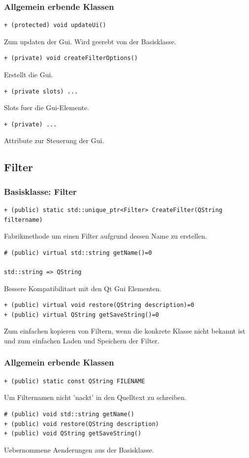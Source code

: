 \documentclass[parskip=full]{scrartcl}
\begin{document}
\subsubsection{Allgemein erbende Klassen}
\begin{verbatim}
+ (protected) void updateUi()
\end{verbatim}
Zum updaten der Gui. Wird geerebt von der Basisklasse.
\begin{verbatim}
+ (private) void createFilterOptions()
\end{verbatim}
Erstellt die Gui.
\begin{verbatim}
+ (private slots) ...
\end{verbatim}
Slots fuer die Gui-Elemente.
\begin{verbatim}
+ (private) ...
\end{verbatim}
Attribute zur Steuerung der Gui.
\newpage
\subsection{Filter}
\subsubsection{Basisklasse: Filter}
\begin{verbatim}
+ (public) static std::unique_ptr<Filter> CreateFilter(QString filtername)
\end{verbatim}
Fabrikmethode um einen Filter aufgrund dessen Name zu erstellen.
\begin{verbatim}
# (public) virtual std::string getName()=0

std::string => QString
\end{verbatim}
Bessere Kompatibilitaet mit den Qt Gui Elementen.

\begin{verbatim}
+ (public) virtual void restore(QString description)=0
+ (public) virtual QString getSaveString()=0
\end{verbatim}
Zum einfachen kopieren von Filtern, wenn die konkrete Klasse nicht bekannt ist und zum einfachen Laden und Speichern der Filter.

\subsubsection{Allgemein erbende Klassen}
\begin{verbatim}
+ (public) static const QString FILENAME
\end{verbatim}
Um Filternamen nicht 'nackt' in den Quelltext zu schreiben.
\begin{verbatim}
# (public) void std::string getName()
+ (public) void restore(QString description)
+ (public) void QString getSaveString()
\end{verbatim}
Uebernommene Aenderungen aus der Basisklasse.
\end{document}
